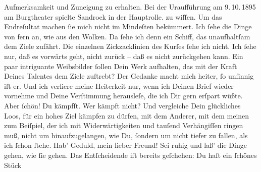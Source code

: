 \begin{ledgroupsized}[t]{13cm}
{{{                  Aufmerksamkeit und Zuneigung zu erhalten. Bei der Uraufführung am 9. 10. 1895 am Burgtheater spielte Sandrock in der Hauptrolle.}}}\label{K_L02728-1h} zu wiſſen. {\pb}Um das Endreſultat machen ſie mich nicht im Mindeſten bekümmert. Ich
               ſehe die Dinge von fern an, wie aus den Wolken. Da ſehe ich denn ein Schiff, das
               unaufhaltſam dem Ziele zufährt. Die einzelnen Zickzacklinien des Kurſes ſehe ich
               nicht. Ich ſehe nur, daß es vorwärts geht, nicht zurück – daß es nicht zurückgehen
               kann. Ein paar intriguante Weibsbilder ſollen Dein Werk aufhalten, das mit der Kraft Deines Talentes dem Ziele zuſtrebt? Der Gedanke
               macht mich heiter, ſo unſinnig iſt er. {\pb}Und ich
               verliere meine Heiterkeit nur, wenn ich Deinen Brief wieder vornehme und Deine
               Verſtimmung herausleſe, die ich Dir gern erſpart wüßte. Aber ſchön! Du kämpfſt. Wer
               kämpft nicht? Und vergleiche Dein glückliches Loos, für ein hohes Ziel kämpfen zu
               dürfen, mit dem Anderer, mit dem meinen zum Beiſpiel, der ich mit Widerwärtigkeiten
               und tauſend Verhängiſſen ringen muß, nicht um hinaufzugelangen, wie Du, ſondern um
               nicht tiefer zu fallen, als ich ſchon ſtehe.\pend
           \pstart
           {\pb}Hab’ Geduld, mein lieber Freund! Sei ruhig und laß’
               die Dinge gehen, wie ſie gehen. Das Entſcheidende iſt bereits geſchehen: Du haſt ein
               ſchönes Stück

\end{ledgroupsized}
